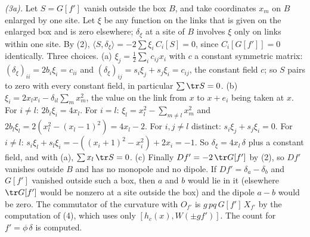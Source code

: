 \emph{(3a).} Let $S = G[f']$ vanish outside the box $B$, and take coordinates $x_{m}$ on $B$ enlarged by one site. Let $\xi$ be any function on the links that is given on the enlarged box and is zero elsewhere; $\delta_{\xi}$ at a site of $B$ involves $\xi$ only on links within one site. By (2), $\langle S, \delta_{\xi}\rangle = -2\sum\xi_{i}\,C_{i}[S] = 0$, since $C_{i}[G[f']] = 0$ identically. Three choices. (a) $\xi_{j} = \tfrac12\sum_{i}c_{ij}x_{i}$ with $c$ a constant symmetric matrix: $(\delta_{\xi})_{ii} = 2b_{i}\xi_{i} = c_{ii}$ and $(\delta_{\xi})_{ij} = s_{i}\xi_{j} + s_{j}\xi_{i} = c_{ij}$, the constant field $c$; so $S$ pairs to zero with every constant field, in particular $\sum\tr S = 0$. (b) $\xi_{i} = 2x_{l}x_{i} - \delta_{il}\sum_{m}x_{m}^{2}$, the value on the link from $x$ to $x + e_{i}$ being taken at $x$. For $i \neq l$: $2b_{i}\xi_{i} = 4x_{l}$. For $i = l$: $\xi_{l} = x_{l}^{2} - \sum_{m\neq l}x_{m}^{2}$ and $2b_{l}\xi_{l} = 2(x_{l}^{2} - (x_{l} - 1)^{2}) = 4x_{l} - 2$. For $i, j \neq l$ distinct: $s_{i}\xi_{j} + s_{j}\xi_{i} = 0$. For $i \neq l$: $s_{i}\xi_{l} + s_{l}\xi_{i} = -((x_{i} + 1)^{2} - x_{i}^{2}) + 2x_{i} = -1$. So $\delta_{\xi} = 4x_{l}\,\delta$ plus a constant field, and with (a), $\sum x_{l}\,\tr S = 0$. (c) Finally $Df' = -2\,\tr G[f']$ by (2), so $Df'$ vanishes outside $B$ and has no monopole and no dipole. If $Df' = \delta_{a} - \delta_{b}$ and $G[f']$ vanished outside such a box, then $a$ and $b$ would lie in it (elsewhere $\tr G[f']$ would be nonzero at a site outside the box) and the dipole $a - b$ would be zero. The commutator of the curvature with $O_{f'}$ is $g\,pq\,G[f']\,X_{f'}$ by the computation of (4), which uses only $[h_{c}(x), W(\pm gf')]$. The count for $f' = \phi\,\delta$ is computed.

